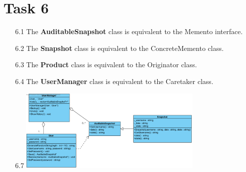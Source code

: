 \documentclass{article}
\begin{document}
\section*{Task 6}
\begin{itemize}
    \item[6.1] The \textbf{AuditableSnapshot} class is equivalent to the Memento interface. 
    \item[6.2] The \textbf{Snapshot} class is equivalent to the ConcreteMemento class. 
    \item[6.3] The \textbf{Product} class is equivalent to the Originator class.
    \item[6.4] The \textbf{UserManager} class is equivalent to the Caretaker class.
    \item[6.7] \includegraphics[width=0.7\textwidth]{../img/Task6_7.png}   
\end{itemize}
\end{document}
